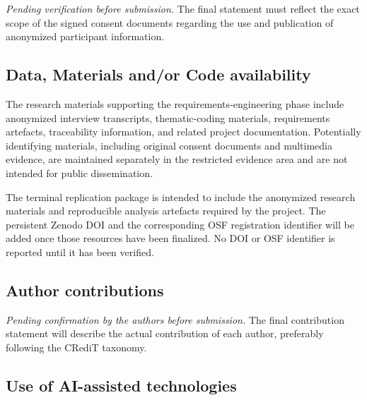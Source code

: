 \documentclass[12pt]{article}
\begin{document}
\textit{Pending verification before submission.}
The final statement must reflect the exact scope of the signed consent
documents regarding the use and publication of anonymized participant
information.


\subsection*{Data, Materials and/or Code availability}

The research materials supporting the requirements-engineering phase
include anonymized interview transcripts, thematic-coding materials,
requirements artefacts, traceability information, and related project
documentation. Potentially identifying materials, including original
consent documents and multimedia evidence, are maintained separately
in the restricted evidence area and are not intended for public
dissemination.

\par
The terminal replication package is intended to include the
anonymized research materials and reproducible analysis artefacts
required by the project. The persistent Zenodo DOI and the
corresponding OSF registration identifier will be added once those
resources have been finalized. No DOI or OSF identifier is reported
until it has been verified.


\subsection*{Author contributions}

\textit{Pending confirmation by the authors before submission.}
The final contribution statement will describe the actual contribution
of each author, preferably following the CRediT taxonomy.


\subsection*{Use of AI-assisted technologies}
\end{document}
